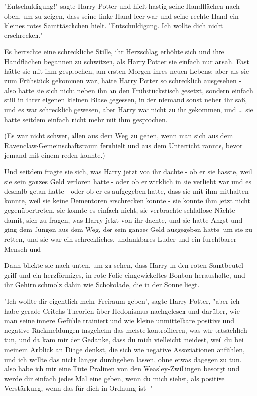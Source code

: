 {"Entschuldigung!" sagte Harry Potter und hielt hastig seine Handflächen nach oben, um zu zeigen, dass seine linke Hand leer war und seine rechte Hand ein kleines rotes Samttäschchen hielt. "Entschuldigung. Ich wollte dich nicht erschrecken."

Es herrschte eine schreckliche Stille, ihr Herzschlag erhöhte sich und ihre Handflächen begannen zu schwitzen, als Harry Potter sie einfach nur ansah. Fast hätte sie mit ihm gesprochen, am ersten Morgen ihres neuen Lebens; aber als sie zum Frühstück gekommen war, hatte Harry Potter so schrecklich ausgesehen - also hatte sie sich nicht neben ihn an den Frühstückstisch gesetzt, sondern einfach still in ihrer eigenen kleinen Blase gegessen, in der niemand sonst neben ihr saß, und es war schrecklich gewesen, aber Harry war nicht zu ihr gekommen, und … sie hatte seitdem einfach nicht mehr mit ihm gesprochen.

(Es war nicht schwer, allen aus dem Weg zu gehen, wenn man sich aus dem Ravenclaw-Gemeinschaftsraum fernhielt und aus dem Unterricht rannte, bevor jemand mit einem reden konnte.)

Und seitdem fragte sie sich, was Harry jetzt von ihr dachte - ob er sie hasste, weil sie sein ganzes Geld verloren hatte - oder ob er wirklich in sie verliebt war und es deshalb getan hatte - oder ob er es aufgegeben hatte, dass sie mit ihm mithalten konnte, weil sie keine Dementoren erschrecken konnte - sie konnte ihm jetzt nicht gegenübertreten, sie konnte es einfach nicht, sie verbrachte schlaflose Nächte damit, sich zu fragen, was Harry jetzt von ihr dachte, und sie hatte Angst und ging dem Jungen aus dem Weg, der sein ganzes Geld ausgegeben hatte, um sie zu retten, und sie war ein schreckliches, undankbares Luder und ein furchtbarer Mensch und -

Dann blickte sie nach unten, um zu sehen, dass Harry in den roten Samtbeutel griff und ein herzförmiges, in rote Folie eingewickeltes Bonbon herausholte, und ihr Gehirn schmolz dahin wie Schokolade, die in der Sonne liegt.

"Ich wollte dir eigentlich mehr Freiraum geben", sagte Harry Potter, "aber ich habe gerade Critchs Theorien über Hedonismus nachgelesen und darüber, wie man seine innere Gefühle trainiert und wie kleine unmittelbare positive und negative Rückmeldungen insgeheim das meiste kontrollieren, was wir tatsächlich tun, und da kam mir der Gedanke, dass du mich vielleicht meidest, weil du bei meinem Anblick an Dinge denkst, die sich wie negative Assoziationen anfühlen, und ich wollte das nicht länger durchgehen lassen, ohne etwas dagegen zu tun, also habe ich mir eine Tüte Pralinen von den Weasley-Zwillingen besorgt und werde dir einfach jedes Mal eine geben, wenn du mich siehst, als positive Verstärkung, wenn das für dich in Ordnung ist -"

}
